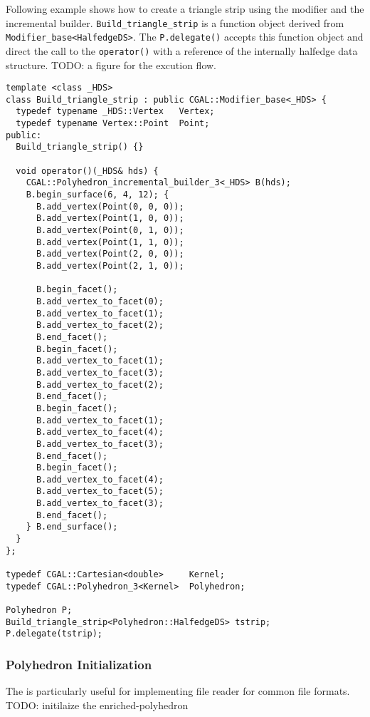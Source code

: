 Following example shows how to create a triangle strip using the 
modifier and the incremental builder. \lstinline!Build_triangle_strip!
is a function object derived from \lstinline!Modifier_base<HalfedgeDS>!. 
The \lstinline!P.delegate()! accepts this function object and 
direct the call to the \lstinline!operator()! with a reference of the
internally halfedge data structure. 
TODO: a figure for the excution flow.

\begin{lstlisting}
template <class _HDS> 
class Build_triangle_strip : public CGAL::Modifier_base<_HDS> {
  typedef typename _HDS::Vertex   Vertex;
  typedef typename Vertex::Point  Point;
public:
  Build_triangle_strip() {}

  void operator()(_HDS& hds) {
    CGAL::Polyhedron_incremental_builder_3<_HDS> B(hds);
    B.begin_surface(6, 4, 12); {
      B.add_vertex(Point(0, 0, 0));
      B.add_vertex(Point(1, 0, 0));
      B.add_vertex(Point(0, 1, 0));
      B.add_vertex(Point(1, 1, 0));
      B.add_vertex(Point(2, 0, 0));
      B.add_vertex(Point(2, 1, 0));

      B.begin_facet();
      B.add_vertex_to_facet(0);
      B.add_vertex_to_facet(1);
      B.add_vertex_to_facet(2);
      B.end_facet();
      B.begin_facet();
      B.add_vertex_to_facet(1);
      B.add_vertex_to_facet(3);
      B.add_vertex_to_facet(2);
      B.end_facet();
      B.begin_facet();
      B.add_vertex_to_facet(1);
      B.add_vertex_to_facet(4);
      B.add_vertex_to_facet(3);
      B.end_facet();
      B.begin_facet();
      B.add_vertex_to_facet(4);
      B.add_vertex_to_facet(5);
      B.add_vertex_to_facet(3);
      B.end_facet();
    } B.end_surface();
  }
};

typedef CGAL::Cartesian<double>     Kernel;
typedef CGAL::Polyhedron_3<Kernel>  Polyhedron;

Polyhedron P;
Build_triangle_strip<Polyhedron::HalfedgeDS> tstrip;
P.delegate(tstrip);
\end{lstlisting}


\subsubsection{Polyhedron Initialization}
The \polybuilder is particularly useful for implementing file reader for 
common file formats. TODO: initilaize the enriched-polyhedron
%

